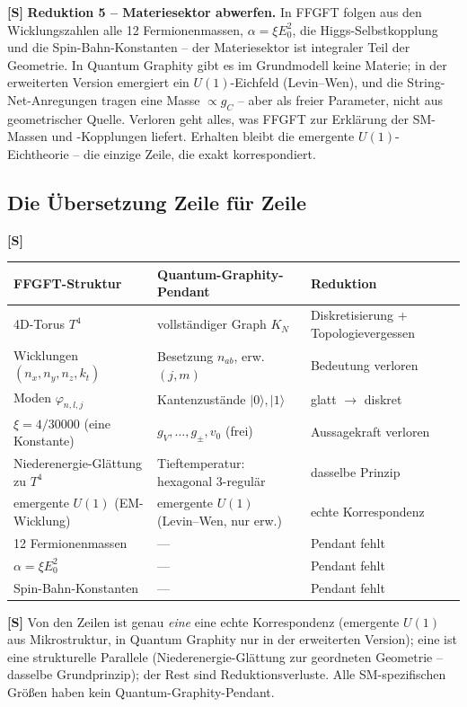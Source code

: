 \textbf{[S]} \textbf{Reduktion 5 -- Materiesektor abwerfen.} In FFGFT folgen aus
den Wicklungszahlen alle 12 Fermionenmassen, $\alpha=\xi E_0^2$, die
Higgs-Selbstkopplung und die Spin-Bahn-Konstanten -- der Materiesektor ist
integraler Teil der Geometrie. In Quantum Graphity gibt es im Grundmodell keine
Materie; in der erweiterten Version emergiert ein $U(1)$-Eichfeld (Levin--Wen),
und die String-Net-Anregungen tragen eine Masse $\propto g_C$ -- aber als freier
Parameter, nicht aus geometrischer Quelle. Verloren geht alles, was FFGFT zur
Erklärung der SM-Massen und -Kopplungen liefert. Erhalten bleibt die emergente
$U(1)$-Eichtheorie -- die einzige Zeile, die exakt korrespondiert.

\subsection*{Die Übersetzung Zeile für Zeile}

\textbf{[S]}
\begin{center}
\renewcommand{\arraystretch}{1.35}
{\small
\begin{tabular}{lll}
\toprule
\textbf{FFGFT-Struktur} & \textbf{Quantum-Graphity-Pendant} & \textbf{Reduktion} \\
\midrule
4D-Torus $T^4$ & vollständiger Graph $K_N$ & Diskretisierung + Topologievergessen \\
Wicklungen $(n_x,n_y,n_z,k_t)$ & Besetzung $n_{ab}$, erw.\ $(j,m)$ & Bedeutung verloren \\
Moden $\varphi_{n,l,j}$ & Kantenzustände $|0\rangle,|1\rangle$ & glatt $\to$ diskret \\
$\xi=4/30000$ (eine Konstante) & $g_V,\dots,g_\pm,v_0$ (frei) & Aussagekraft verloren \\
Niederenergie-Glättung zu $T^4$ & Tieftemperatur: hexagonal $3$-regulär & dasselbe Prinzip \\
emergente $U(1)$ (EM-Wicklung) & emergente $U(1)$ (Levin--Wen, nur erw.) & echte Korrespondenz \\
12 Fermionenmassen & --- & Pendant fehlt \\
$\alpha=\xi E_0^2$ & --- & Pendant fehlt \\
Spin-Bahn-Konstanten & --- & Pendant fehlt \\
\bottomrule
\end{tabular}
}
\renewcommand{\arraystretch}{1.0}
\end{center}

\textbf{[S]} Von den Zeilen ist genau \emph{eine} eine echte Korrespondenz
(emergente $U(1)$ aus Mikrostruktur, in Quantum Graphity nur in der erweiterten
Version); eine ist eine strukturelle Parallele (Niederenergie-Glättung zur
geordneten Geometrie -- dasselbe Grundprinzip); der Rest sind
Reduktionsverluste. Alle SM-spezifischen Größen haben kein Quantum-Graphity-Pendant.

